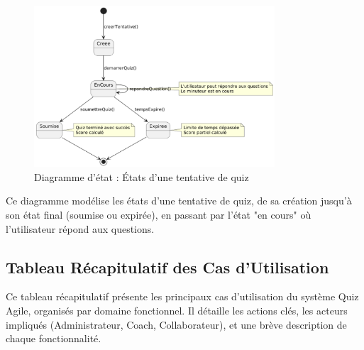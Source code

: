 \documentclass[12pt,a4paper]{report}
\begin{document}
\begin{figure}[htbp]
    \centering
    \includegraphics[width=0.8\textwidth]{latex_media/media/Diagrammedetat-Tentative de Quiz.png}
    \caption{Diagramme d'état : États d'une tentative de quiz}
    \label{fig:etat-tentative-quiz}
\end{figure}

Ce diagramme modélise les états d'une tentative de quiz, de sa création jusqu'à son état final (soumise ou expirée), en passant par l'état "en cours" où l'utilisateur répond aux questions.

\subsection{Tableau Récapitulatif des Cas d'Utilisation}

Ce tableau récapitulatif présente les principaux cas d'utilisation du système Quiz Agile, organisés par domaine fonctionnel. Il détaille les actions clés, les acteurs impliqués (Administrateur, Coach, Collaborateur), et une brève description de chaque fonctionnalité.
\end{document}
